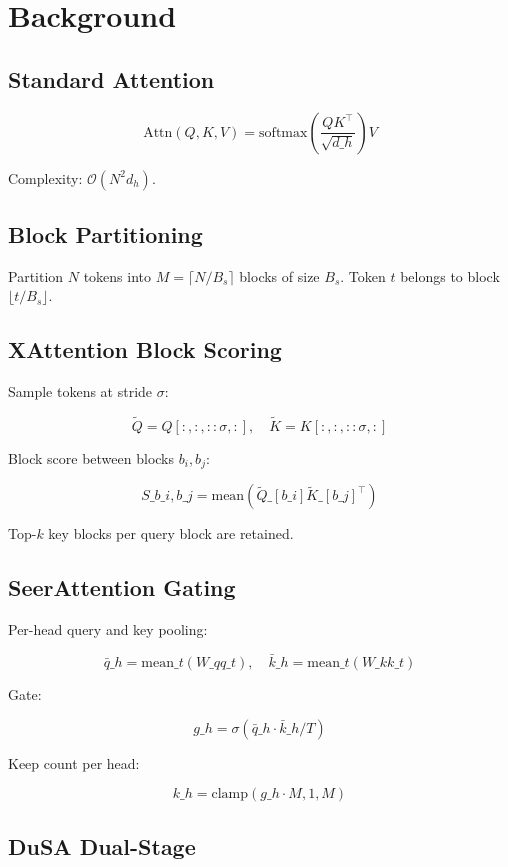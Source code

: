 \section{Background}

\subsection{Standard Attention}

\[
\text{Attn}(Q, K, V) = \text{softmax}\!\left(\frac{Q K^\top}{\sqrt{d\_h}}\right) V
\tag{3.1}
\]

Complexity: $\mathcal{O}(N^2 d_h)$.

\subsection{Block Partitioning}

Partition $N$ tokens into $M = \lceil N / B_s \rceil$ blocks of size $B_s$. 
Token $t$ belongs to block $\lfloor t / B_s \rfloor$.

\subsection{XAttention Block Scoring}

Sample tokens at stride $\sigma$:

\[
\tilde{Q} = Q[:, :, ::\sigma, :], \quad \tilde{K} = K[:, :, ::\sigma, :]
\tag{3.2}
\]

Block score between blocks $b_i, b_j$:

\[
S\_{b\_i, b\_j} = \text{mean}(\tilde{Q}\_{[b\_i]} \tilde{K}\_{[b\_j]}^\top)
\tag{3.3}
\]

Top-$k$ key blocks per query block are retained.

\subsection{SeerAttention Gating}

Per-head query and key pooling:

\[
\bar{q}\_h = \text{mean}\_t(W\_q q\_t), \quad \bar{k}\_h = \text{mean}\_t(W\_k k\_t)
\tag{3.4}
\]

Gate:

\[
g\_h = \sigma(\bar{q}\_h \cdot \bar{k}\_h / T)
\tag{3.5}
\]

Keep count per head:

\[
k\_h = \text{clamp}(g\_h \cdot M, 1, M)
\tag{3.6}
\]

\subsection{DuSA Dual-Stage}

